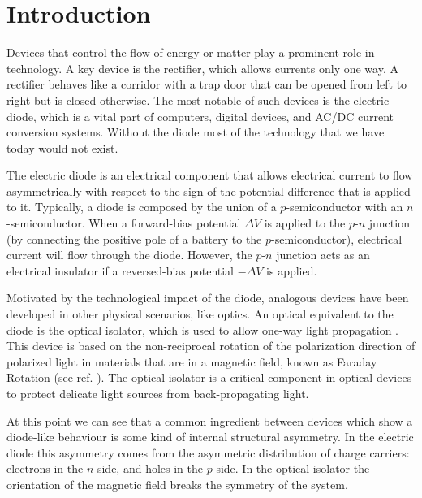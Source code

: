 
\chapter*{Introduction} %
\label{Introduction}

Devices that control the flow of energy or matter play a prominent role in technology. A key device is the rectifier, which allows currents only one way. A rectifier behaves like a corridor with a trap door that can be opened from left to right but is closed otherwise. The most notable of such devices is the electric diode, which is a vital part of computers, digital devices, and AC/DC current conversion systems. Without the diode most of the technology that we have today would not exist.

The electric diode is an electrical component that allows electrical current to flow asymmetrically with respect to the sign of the potential difference that is applied to it. Typically, a diode is composed by the union of a $p$-semiconductor with an $n$-semiconductor. When a forward-bias potential $\Delta V$ is applied to the $p$-$n$ junction (by connecting the positive pole of a battery to the $p$-semiconductor), electrical current will flow through the diode. However, the $p$-$n$ junction acts as an electrical insulator if a reversed-bias potential $-\Delta V$ is applied.

Motivated by the technological impact of the diode, analogous devices have been developed in other physical scenarios, like optics. An optical equivalent to the diode is the optical isolator, which is used to allow one-way light propagation \cite{Saleh1991}. This device is based on the non-reciprocal rotation of the polarization direction of polarized light in materials that are in a magnetic field, known as Faraday Rotation (see ref. \cite{Yariv1984}). The optical isolator is a critical component in optical devices to protect delicate light sources from back-propagating light.

At this point we can see that a common ingredient between devices which show a diode-like behaviour is some kind of internal structural asymmetry. In the electric diode this asymmetry comes from the asymmetric distribution of charge carriers: electrons in the $n$-side, and holes in the $p$-side. In the optical isolator the orientation of the magnetic field breaks the symmetry of the system.

